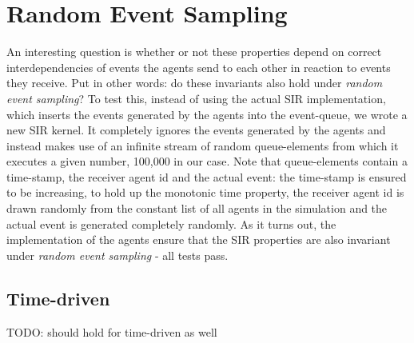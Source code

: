 \section{Random Event Sampling}
An interesting question is whether or not these properties depend on correct interdependencies of events the agents send to each other in reaction to events they receive. Put in other words: do these invariants also hold under \textit{random event sampling}? To test this, instead of using the actual SIR implementation, which inserts the events generated by the agents into the event-queue, we wrote a new SIR kernel. It completely ignores the events generated by the agents and instead makes use of an infinite stream of random queue-elements from which it executes a given number, 100,000 in our case. Note that queue-elements contain a time-stamp, the receiver agent id and the actual event: the time-stamp is ensured to be increasing, to hold up the monotonic time property, the receiver agent id is drawn randomly from the constant list of all agents in the simulation and the actual event is generated completely randomly. As it turns out, the implementation of the agents ensure that the SIR properties are also invariant under \textit{random event sampling} - all tests pass.

\subsection{Time-driven}
TODO: should hold for time-driven as well
